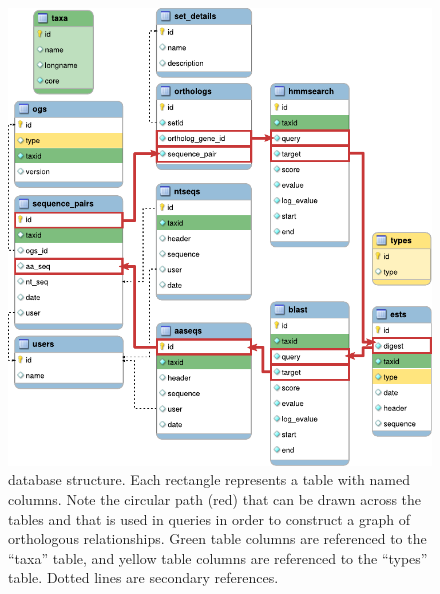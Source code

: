 \begin{figure}[ht]
	\centering
	\includegraphics[width=\textwidth]{img/dbstructure.pdf}
	\caption{\pname database structure. Each rectangle represents a table with
		named columns. Note the circular path (red) that can be drawn across the
		tables and that is used in  queries in order to construct a graph
		of orthologous relationships. Green table columns are referenced to the
		``taxa'' table, and yellow table columns are referenced to the ``types''
		table. Dotted lines are secondary references.
	}
	\label{fig:dbstructure}
\end{figure}


